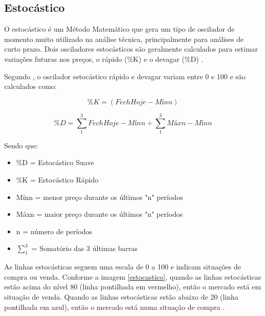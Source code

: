 \subsection{Estocástico}
O estocástico é um Método Matemático que gera um tipo de oscilador de momento muito utilizado na análise técnica, principalmente para análises de curto prazo. Dois osciladores estocásticos são geralmente calculados para estimar variações futuras nos preços, o rápido (\%K) e o devagar (\%D) \cite{advfn}.

Segundo , o oscilador estocástico rápido e devagar variam entre 0 e 100 e são calculados como:

\begin{equation}
\%K = (FechHoje - Mínn) %
\end{equation}

\begin{equation}
\%D = \sum_1^3 {FechHoje - Mínn} \div \sum_1^3{Máxn- Mínn}
\end{equation}

Sendo que:

\begin{itemize}
\item \%D = Estocástico Suave
\item \%K = Estocástico Rápido
\item Mínn = menor preço durante os últimos "n" períodos
\item Máxn = maior preço durante os últimos "n" períodos
\item n = número de períodos
\item $\sum_1^3$ = Somatório das 3 últimas barras
\end{itemize}

As linhas estocásticas seguem uma escala de 0 a 100 e indicam situações de compra ou venda. Conforme a imagem \ref{estocastico}, quando as linhas estocásticas estão acima do nível 80 (linha pontilhada em vermelho), então o mercado está em situação de venda. Quando as linhas estocásticas estão abaixo de 20 (linha pontilhada em azul), então o mercado está numa situação de compra \cite{investforex}.

